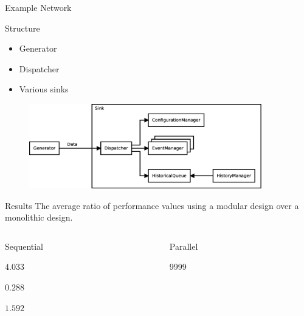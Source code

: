 \begin{frame}{Example Network}
    \begin{block}{Structure}
        \begin{multicols}{3}
            \begin{itemize}
                \item Generator
                \item Dispatcher
                \item Various sinks
            \end{itemize}
        \end{multicols}
    \end{block}
    
    \begin{figure}
        \includegraphics[width=0.9\textwidth]{../../thesis/images/design_test_network.eps}
    \end{figure}
\end{frame}

\begin{frame}{Results}
    The average ratio of performance values using a modular design over a monolithic design.
    \begin{columns}
        \begin{column}{0.48\textwidth}
            \begin{block}{Sequential\strut}
        \begin{description}
            \item[runtime] $4.033$
            \item[created events] $0.288$
            \item[real-time] $1.592$
        \end{description}
            \end{block}
        \end{column}
        \begin{column}{0.48\textwidth}
            \begin{block}{Parallel\strut} %
                \begin{description}
                    \item[runtime] 9999
                \end{description}
            \end{block}
        \end{column}
    \end{columns}
    
\end{frame}